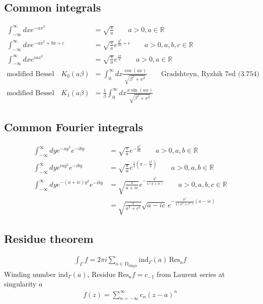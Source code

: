 \documentclass[10pt,a4paper]{book}
\theoremstyle{definition}
\begin{document}
\subsection{Common integrals}
\begin{align}
    \int_{-\infty}^\infty dx e^{-ax^2}&=\sqrt{\frac{\pi}{a}} \qquad a>0, a\in\mathbb{R}\\
    \int_{-\infty}^\infty dx e^{-ax^2+bx+c}&=\sqrt{\frac{\pi}{a}}e^{\frac{b^2}{4a}+c} \qquad a>0, a,b,c\in\mathbb{R}\\
    \int_{-\infty}^\infty dx e^{iax^2}&=\sqrt{\frac{\pi}{a}}e^{\frac{i\pi}{4}} \qquad a>0, a\in\mathbb{R}\\
%    
\text{modified Bessel}\quad K_0(a\beta)&=\int_0^\infty dx \frac{\cos(ax)}{\sqrt{\beta^2+x^2}} \qquad \text{Gradshteyn, Ryzhik 7ed (3.754)}\\
\text{modified Bessel}\quad K_1(a\beta)&=\frac{1}{\beta}\int_0^\infty dx \frac{x\sin(ax)}{\sqrt{\beta^2+x^2}}
\end{align}



\subsection{Common Fourier integrals}
\begin{align}
    \int_{-\infty}^\infty dy e^{-ay^2}e^{-iby}&=\sqrt{\frac{\pi}{a}}e^{-\frac{b^2}{4a}} \qquad a>0, a,b\in\mathbb{R}\\
    \int_{-\infty}^\infty dy e^{iay^2}e^{-iby}&=\sqrt{\frac{\pi}{a}}e^{\frac{i}{4}\left(\pi-\frac{b^2}{a}\right)} \qquad a>0, a,b\in\mathbb{R}\\
    \int_{-\infty}^\infty dy e^{-(a+ic)y^2}e^{-iby}&=\sqrt{\frac{\pi}{a+ic}}e^{-\frac{b^2}{4(a+ic)}} \qquad a>0, a,b,c\in\mathbb{R}\\
    &=\sqrt{\frac{\pi}{a^2+c^2}}\sqrt{a-ic}\,e^{-\frac{b^2}{4(a^2+c^2)}(a-ic)}
\end{align}

\subsection{Residue theorem}
\begin{align}
\int_\Gamma f=2\pi i\sum_{a\in D_\text{Singu}}\text{ind}_\Gamma(a)\,\text{Res}_af
\end{align}
Winding number $\text{ind}_\Gamma(a)$, Residue $\text{Res}_af=c_{-1}$ from Laurent series at singularity $a$
\begin{align}
f(z)=\sum_{n=-\infty}^\infty c_n(z-a)^n
\end{align}
\end{document}

